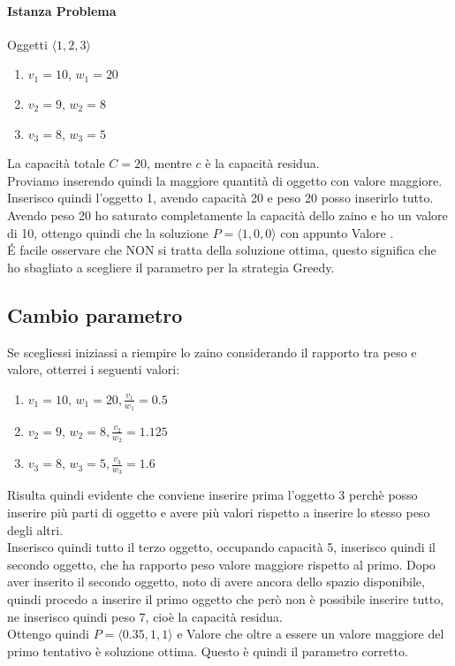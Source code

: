 \paragraph*{Istanza Problema}
Oggetti \ra $\langle 1,2,3 \rangle$
\begin{enumerate}
    \item $v_1 = 10$, $w_1 = 20$
    \item $v_2 = 9$, $w_2 = 8$
    \item $v_3 = 8$, $w_3 = 5$
\end{enumerate}
La capacità totale $C = 20$, mentre $c$ è la capacità residua.\\
Proviamo inserendo quindi la maggiore quantità di oggetto con valore maggiore.\\
Inserisco quindi l'oggetto 1, avendo capacità 20 e peso 20 posso inserirlo tutto.\\
Avendo peso 20 ho saturato completamente la capacità dello zaino e ho un valore di 10,
ottengo quindi che la soluzione $P = \langle 1,0,0 \rangle$ con appunto Valore .\\
\'E facile osservare che NON si tratta della soluzione ottima, questo significa che ho sbagliato
a scegliere il parametro per la strategia Greedy.
\subsection{Cambio parametro}
Se scegliessi iniziassi a riempire lo zaino considerando il rapporto tra peso e valore, otterrei
i seguenti valori:
\begin{enumerate}
    \item $v_1 = 10$, $w_1 = 20, \frac{v_1}{w_1} = 0.5$
    \item $v_2 = 9$, $w_2 = 8, \frac{v_2}{w_2} = 1.125$
    \item $v_3 = 8$, $w_3 = 5, \frac{v_3}{w_3} = 1.6$
\end{enumerate}
Risulta quindi evidente che conviene inserire prima l'oggetto 3 perchè posso inserire
più parti di oggetto e avere più valori rispetto a inserire lo stesso peso degli altri.\\
Inserisco quindi tutto il terzo oggetto, occupando capacità 5, inserisco quindi il secondo oggetto,
che ha rapporto peso valore maggiore rispetto al primo. Dopo aver inserito il secondo oggetto,
noto di avere ancora dello spazio disponibile, quindi procedo a inserire il primo oggetto che però
non è possibile inserire tutto, ne inserisco quindi peso 7, cioè la capacità residua.\\
Ottengo quindi $P = \langle 0.35, 1, 1 \rangle$ e Valore  che oltre a essere un valore
maggiore del primo tentativo è soluzione ottima. Questo è quindi il parametro corretto.
